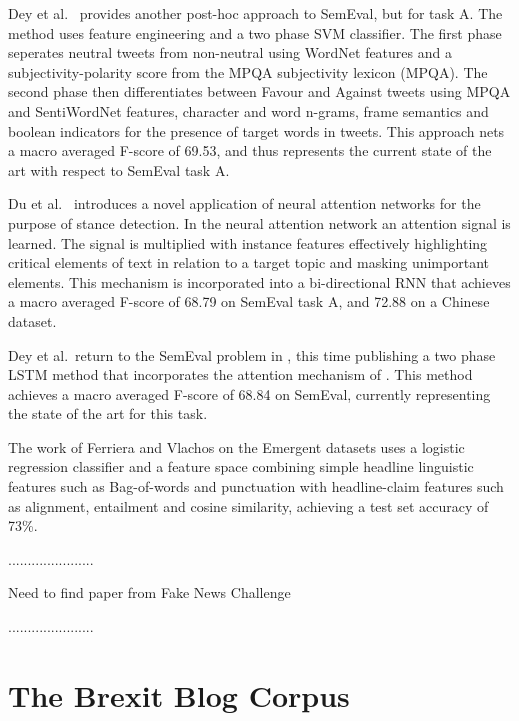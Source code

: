 \documentclass[Dissertation.tex]{subfiles}
\begin{document}
Dey et al.\ \cite{deyTwitterStanceDetection2017} provides another post-hoc approach to SemEval, but for task A. The method uses feature engineering and a two phase SVM classifier. The first phase seperates neutral tweets from non-neutral using WordNet \cite{WordNetLexicalDatabase} features and a subjectivity-polarity score from the MPQA subjectivity lexicon \cite{SubjectivityLexiconMPQA} (MPQA). The second phase then differentiates between Favour and Against tweets using MPQA and SentiWordNet \cite{SentiWordNet} features, character and word n-grams, frame semantics and boolean indicators for the presence of target words in tweets. This approach nets a macro averaged F-score of 69.53, and thus represents the current state of the art with respect to SemEval task A.

Du et al.\ \cite{duStanceClassificationTargetspecific} introduces a novel application of neural attention networks for the purpose of stance detection. In the neural attention network an attention signal is learned. The signal is multiplied with instance features effectively highlighting critical elements of text in relation to a target topic and masking unimportant elements. This mechanism is incorporated into a bi-directional RNN that achieves a macro averaged F-score of 68.79 on SemEval task A, and 72.88 on a Chinese dataset.

Dey et al.\ return to the SemEval problem in \cite{deyTopicalStanceDetection2018}, this time publishing a two phase LSTM method that incorporates the attention mechanism of \cite{duStanceClassificationTargetspecific}. This method achieves a macro averaged F-score of 68.84 on SemEval, currently representing the state of the art for this task.


The work of Ferriera and Vlachos \cite{ferreiraEmergentNovelDataset2016} on the Emergent datasets uses a logistic regression classifier and a feature space combining simple headline linguistic features such as Bag-of-words and punctuation with headline-claim features such as alignment, entailment and cosine similarity, achieving a test set accuracy of 73\%.


......................

Need to find paper from Fake News Challenge

......................
\section{The Brexit Blog Corpus}\label{BBC}
\end{document}
